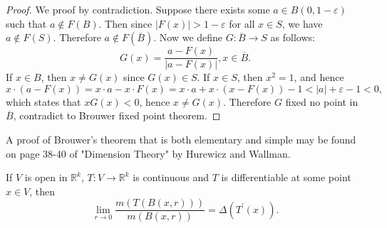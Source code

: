 \begin{proof}
We proof by contradiction. Suppose there exists some $a\in B(0,1-\varepsilon)$ such that $a\notin F(B)$. Then since $|F(x)|>1-\varepsilon$ for all $x\in S$, we have $a\notin F(S)$. Therefore $a\notin F(\overline{B})$. Now we define $G:\overline{B}\to S$ as follows: 
$$
G\left( x \right) =\frac{a-F\left( x \right)}{\left| a-F\left( x \right) \right|},x\in\overline{B}.
$$
If $x\in B$, then $x\ne G(x)$ since $G(x)\in S$. If $x\in S$, then $x^2=1$, and hence 
$$
x\cdot \left( a-F\left( x \right) \right) =x\cdot a-x\cdot F\left( x \right) =x\cdot a+x\cdot \left( x-F\left( x \right) \right) -1<\left| a \right|+\varepsilon -1<0,
$$
which states that $xG(x)<0$, hence $x\ne G(x)$. Therefore $G$ fixed no point in $\overline{B}$, contradict to Brouwer fixed point theorem.
\end{proof}
A proof of Brouwer's theorem that is both elementary and simple may be found on page 38-40 of "Dimension Theory" by Hurewicz and Wallman.
\begin{theorem}
If $V$ is open in $\mathbb{R}^k$, $T:V\to\mathbb{R}^k$ is continuous and $T$ is differentiable at some point $x\in V$, then 
$$
\lim_{r\rightarrow 0} \frac{m\left( T\left( B\left( x,r \right) \right) \right)}{m\left( B\left( x,r \right) \right)}=\Delta \left( T^{\prime}\left( x \right) \right) .
$$
\end{theorem}
